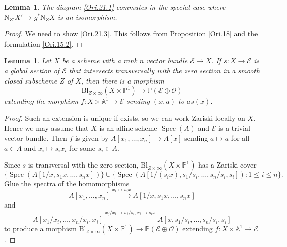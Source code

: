 \documentclass[11pt, a4paper]{amsart}
\newtheorem{lem}[thm]{Lemma}
\theoremstyle{definition}
\numberwithin{equation}{subsection}
\renewcommand{\P}{\mathbb{P}}
\newcommand{\A}{\mathbb{A}}
\providecommand{\Spec}[1]{\operatorname{Spec}(#1)} 	%
\newcommand{\Blow}{{\mathrm{Bl}}}
\newcommand{\Normal}{{\mathrm{N}}}
\newcommand{\cE}{\mathcal{E}}
\newcommand{\cO}{\mathcal{O}}
\begin{document}
\begin{lem}
\label{Ori.27}
The diagram \eqref{Ori.21.1} commutes in the special case where $\Normal_{Z'}X'\to g^*\Normal_Z X$ is an isomorphism.
\end{lem}
\begin{proof}
We need to show \eqref{Ori.21.3}.
This follows from Proposition \ref{Ori.18} and the formulation \eqref{Ori.15.2}.
\end{proof}

\begin{lem}
\label{Ori.23}
Let $X$ be a scheme with a rank $n$ vector bundle $\cE\to X$.
If $s\colon X\to \cE$ is a global section of $\cE$ that intersects transversally with the zero section in a 
smooth closed subscheme $Z$ of $X$, 
then there is a morphism
\[
\Blow_{Z\times \infty}(X\times \P^1)\to \P(\cE\oplus \cO)
\]
extending the morphism $f\colon X\times \A^1\to \cE$ sending $(x,a)$ to $a s(x)$.
\end{lem}
\begin{proof}
Such an extension is unique if exists, so we can work Zariski locally on $X$.
Hence we may assume that $X$ is an affine scheme $\Spec{A}$ and $\cE$ is a trivial vector bundle.
Then $f$ is given by $A[x_1,\ldots,x_n]\to A[x]$ sending $a\mapsto a$ for all $a\in A$ and $x_i\mapsto s_i x_i$ for some $s_i\in A$.

Since $s$ is transversal with the zero section,
$\Blow_{Z\times \infty}(X\times \P^1)$ has a Zariski cover
\[
\{\Spec{A[1/x,s_1x,\ldots,s_nx]}\}
\cup
\{\Spec{A[1/(s_ix),s_1/s_i,\ldots,s_n/s_i,s_i]}:1\leq i\leq n\}.
\]
Glue the spectra of the homomorphisms
\[
A[x_1,\ldots,x_n]
\xrightarrow{x_i\mapsto s_i x}
A[1/x,s_1x,\ldots,s_n x]
\]
and
\[
A[x_1/x_i,\ldots,x_n/x_i,x_i]
\xrightarrow{x_j/x_i\mapsto s_j/s_i,x_i\mapsto s_i x}
A[x,s_1/s_i,\ldots,s_n/s_i,s_i]
\]
to produce a morphism 
$\Blow_{Z\times \infty}(X\times \P^1)\to \P(\cE\oplus \cO)$ extending $f\colon X\times \A^1\to \cE$.
\end{proof}
\end{document}
